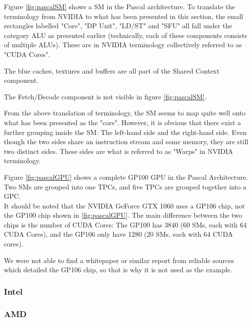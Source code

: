 Figure \ref{fig:pascalSM} shows a \gls{SM} in the Pascal architecture.
To translate the terminology from NVIDIA to what has been presented in this section, the small rectangles labelled "Core", "DP Unit", "LD/ST" and "SFU" all fall under the category \gls{ALU} as presented earlier (technically, each of these components consists of multiple \glspl{ALU}).
These are in NVIDIA terminology collectively referred to as "CUDA Cores".

The blue caches, textures and buffers are all part of the Shared Context component.

The Fetch/Decode component is not visible in figure \ref{fig:pascalSM}.

From the above translation of terminology, the \gls{SM} seems to map quite well onto what has been presented as the "core".
However, it is obvious that there exist a further grouping inside the \gls{SM}: The left-hand side and the right-hand side.
Even though the two sides share an instruction stream and some memory, they are still two distinct sides.
These sides are what is referred to as "Warps" in NVIDIA terminology.


Figure \ref{fig:pascalGPU} shows a complete GP100 GPU in the Pascal Architecture.
Two \glspl{SM} are grouped into one \glspl{TPC}, and five \glspl{TPC} are grouped together into a \gls{GPC}. \\

It should be noted that the NVIDIA GeForce GTX 1060 uses a GP106 chip, not the GP100 chip shown in \ref{fig:pascalGPU}. 
The main difference between the two chips is the number of CUDA Cores: The GP100 has 3840 (60 \glspl{SM}, each with 64 CUDA Cores), and the GP106 only have 1280 (20 \glspl{SM}, each with 64 CUDA cores).

We were not able to find a whitepaper or similar report from reliable sources which detailed the GP106 chip, so that is why it is not used as the example. 


\subsubsection{Intel}


\subsubsection{AMD}
